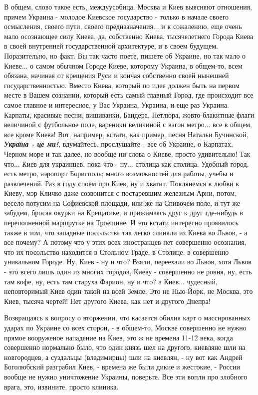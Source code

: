 В общем, слово такое есть, междуусобица.  Москва и Киев выясняют отношения,
причем Украина - молодое Киевское государство - только в начале своего
осмысления, своего пути, своего предназначения... и к сожалению, еще очень мало
осознающее силу Киева, да, собственно Киева, тысячелетнего Города Киева в своей
внутренней государственной архитектуре, и в своем будущем. Поразительно, но
факт. Вы так часто поете, пишете об Украине, но так мало о Киеве... о самом
обычном Городе Киеве, которому Украина, в общем-то, всем обязана, начиная от
крещения Руси и кончая собственно своей нынешней государственностью. Вместо
Киева, который по идее должен быть на первом месте в Вашем сознании, который
есть самый главный Город, где происходит все самое главное и интересное, у Вас
Украина, Украина, и еще раз Украина. Карпаты, красивые песни, вишиванки,
Бандера, Петлюра, жовто-блакитные флаги величиной с футбольное поле, вареники
величиной с вагон метро... все в общем, все кроме Киева! Вот, например, кстати,
как пример, песня Натальи Бучинской, \emph{\textbf{Україна - це ми!}},
вдумайтесь, прослушайте - все об Украине, о Карпатах, Черном море и так далее,
но вообще ни слова о Киеве, просто удивительно! Так что... Киев для украинцев,
пока что - ну...  столица как столица. Удобный город, есть метро, аэропорт
Борисполь; много возможностей для работы, учебы и развлечений. Раз в году споем
про Киев, ну и хватит. Поклянемся в любви к Киеву, мэр Кличко даже созвонится с
постаревшим железным Арни, потом, весело потусим на Софиевской площади, или же
на Спивочем поле, и тут же забудем, бросая окурки на Крещатике, и прижимаясь
друг к друг где-нибудь в переполненной маршрутке на Троещине. И это кстати
интересно проявилось также в том, что западные посольства так легко слиняли из
Киева во Львов, -  а все почему? А потому что у этих всех иностранцев нет
совершенно осознания, что их посольство находится в Стольном Граде, в Столице,
в совершенно уникальном Городе. Ну, Киев - ну и что?  Взяли, переехали во
Львов, хотя Львов - это всего лишь один из многих городов, Киеву - совершенно
не ровня, ну, есть там кофе, ну, есть там старуха Фарион, ну и что? а Киев...
чудесный, неповторимый Киев один такой на всей Земле. Это не Нью-Йорк, не
Москва, это Киев, тысяча чертей!  Нет другого Киева, как нет и другого Днепра!

Возвращаясь к вопросу о вторжении, что касается обилия карт о массированных
ударах по Украине со всех сторон, -  в общем-то, Москве совершенно не нужно
прямое вооруженое нападение на Киев, это ж не времена 11-12 века, когда
совершенно нормально было, что один князь шел на другого, киевляне шли на
новгородцев, а суздальцы (владимирцы) шли на киевлян, - ну вот как Андрей
Боголюбский разграбил Киев, - времена же были дикие и жестокие, - России вообще
не нужно уничтожение Украины, поверьте. Все эти вопли про злобного врага, это,
извините, просто клиника. 

